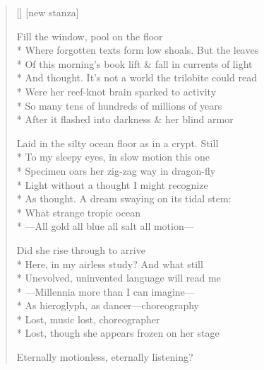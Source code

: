 \begin{verse}[\versewidth]
[new stanza]



Fill the window, pool on the floor\\*
Where forgotten texts form low shoals. But the leaves\\*
Of this morning's book lift \& fall in currents of light\\*
And thought. It's not a world the trilobite could read\\*
Were her reef-knot brain sparked to activity\\*
So many tens of hundreds of millions of years\\*
After it flashed into darkness \& her blind armor

Laid in the silty ocean floor as in a crypt.  Still\\*
To my sleepy eyes, in slow motion this one\\*
Specimen oars her zig-zag way in dragon-fly\\*
Light without a thought I might recognize\\*
As thought. A dream swaying on its tidal stem:\\*
What strange tropic ocean\\*
---All gold all blue all salt all motion---

Did she rise through to arrive\\*
Here, in my airless study?  And what still\\*
Unevolved, uninvented language will read me\\*
---Millennia more than I can imagine---\\*
As hieroglyph, as dancer---choreography \\*
Lost, music lost, choreographer\\*
Lost, though she appears frozen on her stage

Eternally motionless, eternally listening?
\end{verse}
